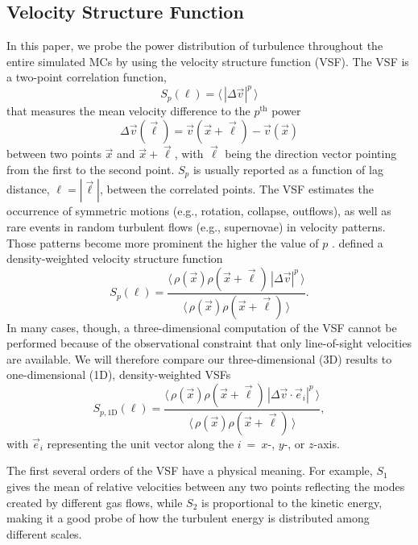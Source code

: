 \subsection{Velocity Structure Function}\label{methods:vsf}

In this paper, we probe the power distribution of turbulence throughout the entire simulated MCs by using the velocity structure function (VSF).
The VSF is a two-point correlation function,
\begin{equation}
	{S}_p (\ell) = \langle \, |\Delta \vec{v}|^p  \, \rangle
	\label{equ:method:def_vsf}
\end{equation}
that measures the mean velocity difference to the $p^\mathrm{th}$ power
\begin{equation}\Delta \vec{v} (\vec{\ell}) = \vec{v}(\vec{x}+\vec{\ell}) - \vec{v}(\vec{x})
\end{equation} 
between two points $\vec{x}$ and $\vec{x}+\vec{\ell}$, with $\vec{\ell}$ being the direction vector pointing from the first to the second point.  
$S_p$ is usually reported as a function of lag distance, $\ell = |\vec{\ell}|$, between the correlated points.
The VSF estimates the occurrence of symmetric motions (e.g., rotation, collapse, outflows), as well as rare events in random turbulent flows (e.g., supernovae) in velocity patterns.
Those patterns become more prominent the higher the value of $p$ \citep{Heyer2004}.
\citet{Padoan2016a} defined a density-weighted velocity structure function
\begin{equation}
	{S}_p (\ell) = \frac{\langle \, \rho(\vec{x}) \rho(\vec{x}+\vec{\ell}) \, |\Delta \vec{v}|^p  \, \rangle}{\langle  \, \rho(\vec{x}) \rho(\vec{x}+\vec{\ell}) \, \rangle}.
	\label{equ:method:def_vsf_dw}
\end{equation}
In many cases, though, a three-dimensional computation of the VSF cannot be performed because of the observational constraint that only line-of-sight velocities are available.
We will therefore compare our three-dimensional (3D) results to one-dimensional (1D), density-weighted VSFs
\begin{equation}
	\mathit{S}_{p,\mathrm{1D}} (\ell) = \frac{\langle \, \rho(\vec{x}) \rho(\vec{x}+\vec{\ell}) \, |\Delta 
        \vec{v} \cdot \vec{e}_i|^p  \, \rangle}{\langle  \, \rho(\vec{x}) \rho(\vec{x}+\vec{\ell}) \, \rangle} ,
	\label{equ:results:def_vsf_1d}
\end{equation}
with $\vec{e}_i$ representing the unit vector along the $i$~=~$x$-, $y$-, or $z$-axis.

The first several orders of the VSF have a physical meaning. 
For example, $\mathit{S}_1$ gives the mean of relative velocities between any two points reflecting the modes created by different gas flows, while $\mathit{S}_2$ is proportional to the kinetic energy, making it a good probe of how the turbulent energy is distributed among different scales.

